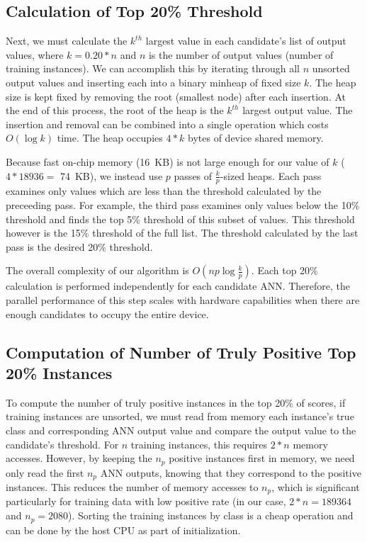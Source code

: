 \documentclass[11pt]{article}       %
\begin{document}
\subsection{Calculation of Top 20\% Threshold} \label{implementation}
Next, we must calculate the $k^{th}$ largest value in each candidate's list of output values, where $k = 0.20 * n$ and $n$ is the number of output values (number of training instances). We can accomplish this by iterating through all $n$ unsorted output values and inserting each into a binary minheap of fixed size $k$. The heap size is kept fixed by removing the root (smallest node) after each insertion. At the end of this process, the root of the heap is the $k^{th}$ largest output value. The insertion and removal can be combined into a single operation which costs $O(\log k)$ time. The heap occupies $4 * k$ bytes of device shared memory.

Because fast on-chip memory (16~KB) is not large enough for our value of $k$ ($4 * 18936 =$ 74~KB), we instead use $p$ passes of $\frac{k}{p}$-sized heaps. Each pass examines only values which are less than the threshold calculated by the preceeding pass. For example, the third pass examines only values below the 10\% threshold and finds the top 5\% threshold of this subset of values. This threshold however is the 15\% threshold of the full list. The threshold calculated by the last pass is the desired 20\% threshold.

The overall complexity of our algorithm is $O(np \log \frac{k}{p})$. Each top 20\% calculation is performed independently for each candidate ANN. Therefore, the parallel performance of this step scales with hardware capabilities when there are enough candidates to occupy the entire device.

\subsection{Computation of Number of Truly Positive Top 20\% Instances} \label{implementation}
To compute the number of truly positive instances in the top 20\% of scores, if training instances are unsorted, we must read from memory each instance's true class and corresponding ANN output value and compare the output value to the candidate's threshold. For $n$ training instances, this requires $2 * n$ memory accesses. However, by keeping the $n_p$ positive instances first in memory, we need only read the first $n_p$ ANN outputs, knowing that they correspond to the positive instances. This reduces the number of memory accesses to $n_p$, which is significant particularly for training data with low positive rate (in our case, $2 * n = 189364$ and $n_p = 2080$). Sorting the training instances by class is a cheap operation and can be done by the host CPU as part of initialization.
\end{document}
